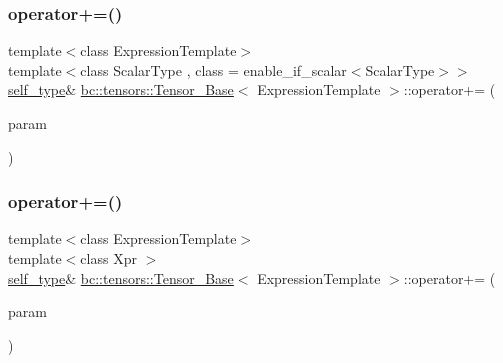 \mbox{\label{classbc_1_1tensors_1_1Tensor__Base_abe1b66e48596f43dfc7f474ce432efa3}} 
\subsubsection{\texorpdfstring{operator+=()}{operator+=()}\hspace{0.1cm}{\footnotesize\ttfamily [1/2]}}
{\footnotesize\ttfamily template$<$class Expression\+Template$>$ \\
template$<$class Scalar\+Type , class  = enable\+\_\+if\+\_\+scalar$<$\+Scalar\+Type$>$$>$ \\
\hyperlink{classbc_1_1tensors_1_1Expression__Base}{self\+\_\+type}\& \hyperlink{classbc_1_1tensors_1_1Tensor__Base}{bc\+::tensors\+::\+Tensor\+\_\+\+Base}$<$ Expression\+Template $>$\+::operator+= (\begin{DoxyParamCaption}\item[{const Scalar\+Type \&}]{param }\end{DoxyParamCaption})\hspace{0.3cm}{\ttfamily [inline]}}

\mbox{\label{classbc_1_1tensors_1_1Tensor__Base_a450511fb41ea6cd0e4462a0c5b76483f}} 
\subsubsection{\texorpdfstring{operator+=()}{operator+=()}\hspace{0.1cm}{\footnotesize\ttfamily [2/2]}}
{\footnotesize\ttfamily template$<$class Expression\+Template$>$ \\
template$<$class Xpr $>$ \\
\hyperlink{classbc_1_1tensors_1_1Expression__Base}{self\+\_\+type}\& \hyperlink{classbc_1_1tensors_1_1Tensor__Base}{bc\+::tensors\+::\+Tensor\+\_\+\+Base}$<$ Expression\+Template $>$\+::operator+= (\begin{DoxyParamCaption}\item[{const \hyperlink{classbc_1_1tensors_1_1Expression__Base}{Expression\+\_\+\+Base}$<$ Xpr $>$ \&}]{param }\end{DoxyParamCaption})\hspace{0.3cm}{\ttfamily [inline]}}

